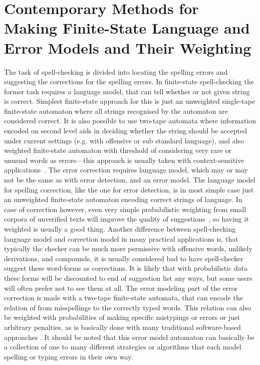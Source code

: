 \documentclass[a4paper,12pt]{article}
\begin{document}
\section{Contemporary Methods for Making Finite-State Language and Error Models and Their Weighting}
\label{sec:methods}

The task of spell-checking is divided into locating the spelling errors and
suggesting the corrections for the spelling errors. In finite-state
spell-checking the former task requires a language model, that can tell whether
or not given string is correct. Simplest finite-state approach for this is just
an unweighted single-tape finite-state automaton where all strings recognised
by the automaton are considered correct. It is also possible to use two-tape
automata where information encoded on second level aids in deciding whether the
string should be accepted under current settings (e.g. with offensive or sub
standard language), and also weighted finite-state automaton with threshold of
considering very rare or unusual words as errors---this approach is usually
taken with context-sensitive applications~\cite{otero/2007}. The error
correction requires language model, which may or may not be the same as with
error detection, and an error model. The language model for spelling
correction, like the one for error detection, is in most simple case just an
unweighted finite-state automaton encoding correct strings of language. In case
of correction however, even very simple probabilistic weighting from small
corpora of unverified texts will improve the quality of
suggestions~\cite{pirinen/2010/lrec}, so having it weighted is usually a good
thing. Another difference between spell-checking language model and correction
model in many practical applications is, that typically the checker can be much
more permissive with offensive words, unlikely derivations, and compounds, it
is usually considered bad to have spell-checker suggest these word-forms as
corrections. It is likely that with probabilistic data these forms will be
discounted to end of suggestion list any ways, but some users will often prefer
not to see them at all. The error modeling part of the error correction is made
with a two-tape finite-state automata, that can encode the relation of from
misspellings to the correctly typed words. This relation can also be weighted
with probabilities of making specific mistypings or errors or just arbitrary
penalties, as is basically done with many traditional software-based approaches
\cite{hunspell/manual}. It should be noted that this error model automaton can
basically be a collection of one to many different strategies or algorithms
that each model spelling or typing errors in their own way.
\end{document}
